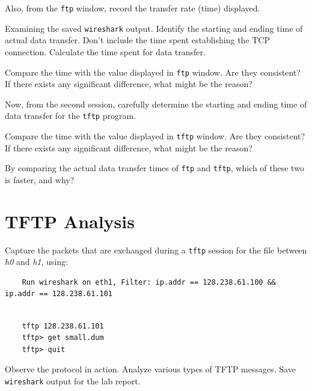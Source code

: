 \documentclass{UTNetLab}
\begin{document}

    Also, from the \lstinline{ftp} window, record the transfer rate (time) displayed. 
  
    \begin{report}
    \item Examining the saved \lstinline{wireshark} output. Identify the starting and ending time of actual data transfer.
    Don’t include the time spent establishing the TCP connection.
    Calculate the time spent for data transfer. 

    \item Compare the time with the value displayed in \lstinline{ftp} window.
    Are they consistent?
    If there exists any significant difference, what might be the reason? 

    \item Now, from the second session, carefully determine the starting and ending time of data transfer for the \lstinline{tftp} program. 

    \item Compare the time with the value displayed in \lstinline{tftp} window.
    Are they consistent?
    If there exists any significant difference, what might be the reason? 

    \item By comparing the actual data transfer times of \lstinline{ftp} and \lstinline{tftp}, which of these two is faster, and why?
    \end{report}

\section{TFTP Analysis}
    Capture the packets that are exchanged during a \lstinline{tftp} session for the  file between \textit{h0} and \textit{h1}, using:
    
    \begin{lstlisting}
    Run wireshark on eth1, Filter: ip.addr == 128.238.61.100 && ip.addr == 128.238.61.101
     
    \end{lstlisting}
    
    \begin{lstlisting}
    tftp 128.238.61.101
    tftp> get small.dum
    tftp> quit
    \end{lstlisting}
    Observe the protocol in action.    Analyze various types of TFTP messages. Save \lstinline{wireshark} output for the lab report.
    
\end{document}
